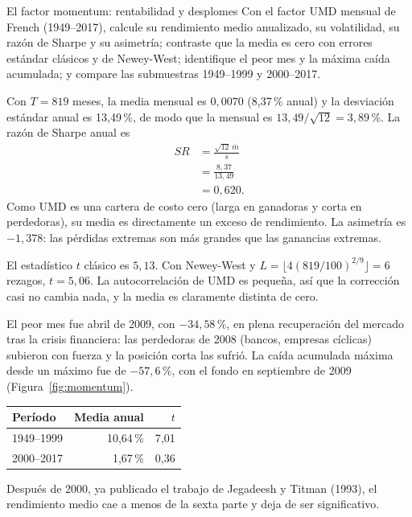 \begin{ejresuelto}{El factor momentum: rentabilidad y desplomes}\label{ej:momentum}
\enunciado Con el factor UMD mensual de French (1949--2017), calcule su rendimiento medio anualizado, su
volatilidad, su razón de Sharpe y su asimetría; contraste que la media es cero con errores estándar clásicos y de
Newey-West; identifique el peor mes y la máxima caída acumulada; y compare las submuestras 1949--1999 y
2000--2017.

\solucion
{} Con $T=819$ meses, la media mensual es $0{,}0070$ (8,37\,\% anual) y la desviación
estándar anual es 13,49\,\%, de modo que la mensual es $13{,}49/\sqrt{12}=3{,}89$\,\%. La razón de Sharpe anual
es
\begin{align*}
  SR &= \frac{\sqrt{12}\,\bar m}{s}\\
     &= \frac{8{,}37}{13{,}49}\\
     &= 0{,}620 .
\end{align*}
Como UMD es una cartera de costo cero (larga en ganadoras y corta en perdedoras), su media es directamente un
exceso de rendimiento. La asimetría es $-1{,}378$: las pérdidas extremas son más grandes que las ganancias
extremas.

 El estadístico $t$ clásico es $5{,}13$. Con Newey-West y
$L=\lfloor4(819/100)^{2/9}\rfloor=6$ rezagos, $t=5{,}06$. La autocorrelación de UMD es pequeña, así que la
corrección casi no cambia nada, y la media es claramente distinta de cero.

 El peor mes fue abril de 2009, con $-34{,}58$\,\%, en plena recuperación del
mercado tras la crisis financiera: las perdedoras de 2008 (bancos, empresas cíclicas) subieron con fuerza y la
posición corta las sufrió. La caída acumulada máxima desde un máximo fue de $-57{,}6$\,\%, con el fondo en
septiembre de 2009 (Figura~\ref{fig:momentum}).

\begin{center}\small
\begin{tabular}{@{}lrr@{}}
\toprule
Período & Media anual & $t$ \\
\midrule
1949--1999 & 10,64\,\% & 7,01 \\
2000--2017 & 1,67\,\% & 0,36 \\
\bottomrule
\end{tabular}
\end{center}
Después de 2000, ya publicado el trabajo de Jegadeesh y Titman (1993), el rendimiento medio cae a menos de la
sexta parte y deja de ser significativo.


\end{ejresuelto}
